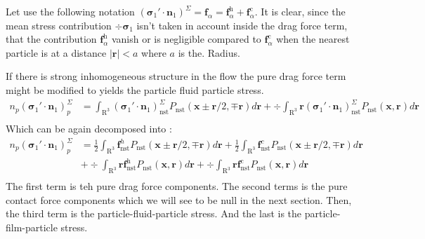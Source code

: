 Let use the following notation $(\bm{\sigma}_1' \cdot \textbf{n}_1)^\Sigma = \textbf{f}_\alpha = \textbf{f}_\alpha^\text{h}+\textbf{f}_\alpha^\text{c}$. 
It is clear, since the mean stress contribution $\div \bm{\sigma}_1$ isn't taken in account inside the drag force term, that the contribution $\textbf{f}_\alpha^\text{h}$ vanish or is negligible compared to $\textbf{f}_\alpha^\text{c}$ when the nearest particle is at a distance $|\textbf{r}| < a$ where $a$ is the.  Radius. 

If there is strong inhomogeneous structure in the flow the pure drag force term might be modified to yields the particle fluid particle stress. 
\begin{align*}
    n_p (\bm{\sigma}_1' \cdot \textbf{n}_1)_p^\Sigma
    &= 
    \int_{\mathrm{R}^3} (\bm{\sigma}_1' \cdot \textbf{n}_1)_\text{nst}^\Sigma
    P_\text{nst}(\textbf{x}\pm\textbf{r}/2,\mp\textbf{r}) d\textbf{r}
    +\div \int_{\mathrm{R}^3} \textbf{r} (\bm{\sigma}_1' \cdot \textbf{n}_1)_\text{nst}^\Sigma
    P_\text{nst}(\textbf{x},\textbf{r}) d\textbf{r}\\
\end{align*}
Which can be again decomposed into : 
\begin{align*}
    n_p (\bm{\sigma}_1' \cdot \textbf{n}_1)_p^\Sigma
    &= 
    \frac{1}{2}\int_{\mathrm{R}^3} \textbf{f}^h_\text{nst}P_\text{nst}(\textbf{x}\pm\textbf{r}/2,\mp\textbf{r}) d\textbf{r}
    + \frac{1}{2}\int_{\mathrm{R}^3} \textbf{f}^c_\text{nst}P_\text{nst}(\textbf{x}\pm\textbf{r}/2,\mp\textbf{r}) d\textbf{r} \\
    &
    +\div \int_{\mathrm{R}^3} \textbf{r} \textbf{f}_\text{nst}^\text{h} P_\text{nst}(\textbf{x},\textbf{r}) d\textbf{r}
    +\div \int_{\mathrm{R}^3} \textbf{r} \textbf{f}_\text{nst}^\text{c} P_\text{nst}(\textbf{x},\textbf{r}) d\textbf{r}\\
\end{align*}
The first term is teh pure drag force components. 
The second terms is the pure contact force components which we will see to be null in the next section. 
Then, the third term is the particle-fluid-particle stress. 
And the last is the particle-film-particle stress. 


